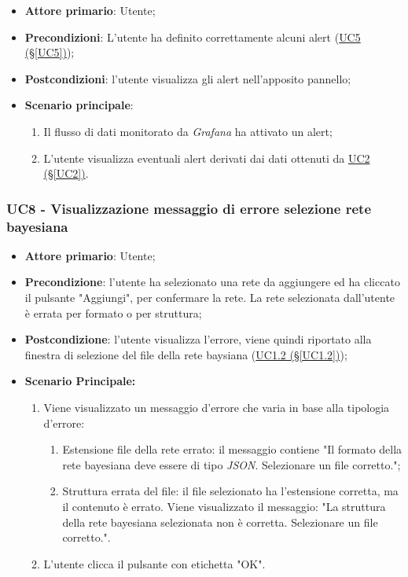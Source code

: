 \begin{itemize}
	\item \textbf{Attore primario}: Utente;
	\item \textbf{Precondizioni}: L'utente ha definito correttamente alcuni alert (\hyperref[UC5]{UC5 											(§\ref*{UC5})});
	\item \textbf{Postcondizioni}: l'utente visualizza gli alert nell'apposito pannello;
	\item \textbf{Scenario principale}:
	\begin{enumerate}
		\item Il flusso di dati monitorato da \textit{Grafana} ha attivato un alert;
		\item L'utente visualizza eventuali alert derivati dai dati ottenuti da  \hyperref[UC2]{UC2 (§\ref*{UC2})}.
	\end{enumerate}
\end{itemize}

\pagebreak

\subsubsection{UC8 - Visualizzazione messaggio di errore selezione rete bayesiana}\label{UC8}
\begin{itemize}
\item \textbf{Attore primario}: Utente;
\item \textbf{Precondizione}: l'utente ha selezionato una rete da aggiungere ed ha cliccato il pulsante "Aggiungi", per confermare la rete. La rete selezionata dall'utente è errata per formato o per struttura;
\item \textbf{Postcondizione}: l'utente visualizza l'errore, viene quindi riportato alla finestra di selezione del file della rete baysiana (\hyperref[UC1.2]{UC1.2 (§\ref*{UC1.2})});
\item \textbf{Scenario Principale:} 
	\begin{enumerate}
		\item Viene visualizzato un messaggio d'errore che varia in base alla tipologia d'errore:
			\begin{enumerate}
				\item Estensione file della rete errato: il messaggio contiene "Il formato della rete bayesiana deve essere di tipo \textit{JSON}. Selezionare un file corretto.";
				\item Struttura errata del file: il file selezionato ha l'estensione corretta, ma il contenuto è errato. Viene visualizzato il messaggio: "La struttura della rete bayesiana selezionata non è corretta. Selezionare un file corretto.".
			\end{enumerate}
		\item L'utente clicca il pulsante con etichetta "OK".
	\end{enumerate}
\end{itemize}

